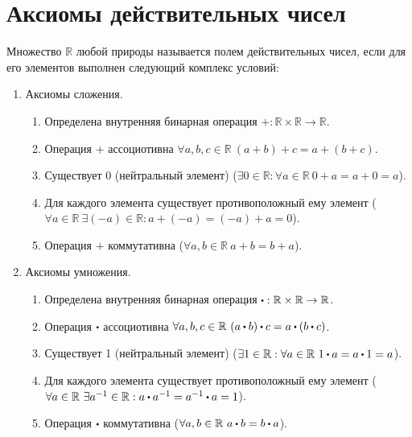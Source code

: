 \documentclass{article}
\begin{document}
    \section{Аксиомы действительных чисел}
    \begin{definition}
        Множество \(\mathbb{R}\) любой природы называется полем действительных чисел, если для его элементов выполнен следующий комплекс условий:
        \begin{enumerate}
            \item Аксиомы сложения.
            \begin{enumerate}[label=$\arabic*_{+}$]
                \item Определена внутренняя бинарная операция \(+: \mathbb{R} \times \mathbb{R} \to \mathbb{R}\).
                \item Операция \(+\) ассоциотивна \(\forall a, b, c \in \mathbb{R}\ (a + b) + c = a + (b + c)\).
                \item Существует 0 (нейтральный элемент) (\(\exists 0 \in \mathbb{R}: \forall a \in \mathbb{R}\ 0 + a = a + 0 = a\)).
                \item Для каждого элемента существует противоположный ему элемент (\(\forall a \in \mathbb{R}\ \exists (-a) \in \mathbb{R}: a + (-a) = (-a) + a = 0\)).
                \item Операция \(+\) коммутативна (\(\forall a, b \in \mathbb{R}\ a + b = b + a\)). 
            \end{enumerate}
            \item Аксиомы умножения.
            \begin{enumerate}[label=$\arabic*_{\dt}$]
                \item Определена внутренняя бинарная операция \(\dt: \mathbb{R} \times \mathbb{R} \to \mathbb{R} \).
                \item Операция \(\dt\) ассоциотивна \(\forall a, b, c \in \mathbb{R}\ (a \dt b) \dt c = a \dt (b \dt c)\).
                \item Существует 1 (нейтральный элемент) (\(\exists 1 \in \mathbb{R}: \forall a \in \mathbb{R}\ 1 \dt a = a \dt 1 = a\)).
                \item Для каждого элемента существует противоположный ему элемент (\(\forall a \in \mathbb{R}\ \exists a^{-1} \in \mathbb{R}: a \dt a^{-1} = a^{-1} \dt a = 1\)).
                \item Операция \(\dt\) коммутативна (\(\forall a, b \in \mathbb{R}\ a \dt b = b \dt a\)).
            \end{enumerate}

\end{enumerate}
\end{definition}
\end{document}
